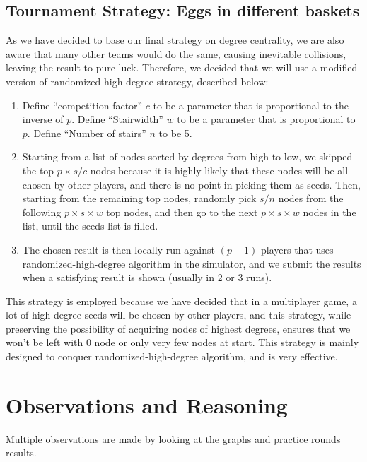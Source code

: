 \documentclass[12pt]{article}
\begin{document}
\subsection{Tournament Strategy: Eggs in different baskets}
As we have decided to base our final strategy on degree centrality, we are also aware that many other teams would do the same, causing inevitable collisions, leaving the result to pure luck. Therefore, we decided that we will use a modified version of randomized-high-degree strategy, described below:
\begin{enumerate}
\item Define ``competition factor'' $c$ to be a parameter that is proportional to the inverse of $p$. Define ``Stairwidth'' $w$ to be a parameter that is proportional to $p$. Define ``Number of stairs'' $n$ to be 5. 
\item Starting from a list of nodes sorted by degrees from high to low, we skipped the top $p \times s / c$ nodes because it is highly likely that these nodes will be all chosen by other players, and there is no point in picking them as seeds. Then, starting from the remaining top nodes, randomly pick $s / n$ nodes from the following $p \times s \times w$ top nodes, and then go to the next $p \times s \times w$ nodes in the list, until the seeds list is filled.
\item The chosen result is then locally run against $(p - 1)$ players that uses randomized-high-degree algorithm in the simulator, and we submit the results when a satisfying result is shown (usually in 2 or 3 runs). 
\end{enumerate}
This strategy is employed because we have decided that in a multiplayer game, a lot of high degree seeds will be chosen by other players, and this strategy, while preserving the possibility of acquiring nodes of highest degrees, ensures that we won't be left with 0 node or only very few nodes at start. This strategy is mainly designed to conquer randomized-high-degree algorithm, and is very effective. 

\section{Observations and Reasoning}
Multiple observations are made by looking at the graphs and practice rounds results.
\end{document}
